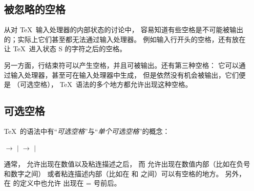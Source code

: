 \documentclass{book}
\begin{document}
\subsection{被忽略的空格}

从对 \TeX\ 输入处理器的内部状态的讨论中，
容易知道有些空格是不可能被输出的；实际上它们甚至都无法通过输入处理器。
例如输入行开头的空格，还有放在让 \TeX\ 进入状态 {\italic S} 的字符之后的空格。

另一方面，行结束符可以产生空格，并且可被输出。还有第三种空格：
它可以通过输入处理器，甚至可在输入处理器中生成，
但是依然没有机会被输出，它们便是 （可选空格），
\TeX\ 语法的多个地方都允许出现这种空格。

\subsection{可选空格}

\TeX\ 的语法中有“{\em 可选空格}”与“{\em 单个可选空格}”的概念：
\begin{disp} $\longrightarrow$
 $|$ \nl
{} $\longrightarrow$
 $|$ \end{disp}
通常， 允许出现在数值以及粘连描述之后，
而  允许出现在数值内部（比如在负号和数字之间）%
或者粘连描述内部（比如在  和  之间）可以有空格的地方。
另外，在  的定义中也允许  出现在 \n= 号前后。
\end{document}

